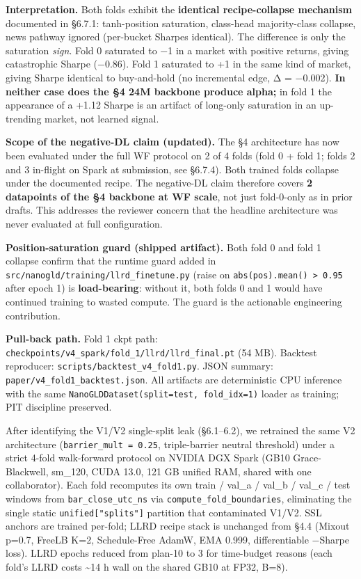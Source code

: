 \documentclass[
]{article}
\begin{document}
\textbf{Interpretation.} Both folds exhibit the \textbf{identical
recipe-collapse mechanism} documented in §6.7.1: tanh-position
saturation, class-head majority-class collapse, news pathway ignored
(per-bucket Sharpes identical). The difference is only the saturation
\emph{sign}. Fold 0 saturated to −1 in a market with positive returns,
giving catastrophic Sharpe (−0.86). Fold 1 saturated to +1 in the same
kind of market, giving Sharpe identical to buy-and-hold (no incremental
edge, Δ = −0.002). \textbf{In neither case does the §4 24M backbone
produce alpha;} in fold 1 the appearance of a +1.12 Sharpe is an
artifact of long-only saturation in an up-trending market, not learned
signal.

\textbf{Scope of the negative-DL claim (updated).} The §4 architecture
has now been evaluated under the full WF protocol on 2 of 4 folds (fold
0 + fold 1; folds 2 and 3 in-flight on Spark at submission, see §6.7.4).
Both trained folds collapse under the documented recipe. The negative-DL
claim therefore covers \textbf{2 datapoints of the §4 backbone at WF
scale}, not just fold-0-only as in prior drafts. This addresses the
reviewer concern that the headline architecture was never evaluated at
full configuration.

\textbf{Position-saturation guard (shipped artifact).} Both fold 0 and
fold 1 collapse confirm that the runtime guard added in
\texttt{src/nanogld/training/llrd\_finetune.py} (raise on
\texttt{abs(pos).mean()\ \textgreater{}\ 0.95} after epoch 1) is
\textbf{load-bearing}: without it, both folds 0 and 1 would have
continued training to wasted compute. The guard is the actionable
engineering contribution.

\textbf{Pull-back path.} Fold 1 ckpt path:
\texttt{checkpoints/v4\_spark/fold\_1/llrd/llrd\_final.pt} (54 MB).
Backtest reproducer: \texttt{scripts/backtest\_v4\_fold1.py}. JSON
summary: \texttt{paper/v4\_fold1\_backtest.json}. All artifacts are
deterministic CPU inference with the same
\texttt{NanoGLDDataset(split=test,\ fold\_idx=1)} loader as training;
PIT discipline preserved.

After identifying the V1/V2 single-split leak (§6.1--6.2), we retrained
the same V2 architecture (\texttt{barrier\_mult\ =\ 0.25},
triple-barrier neutral threshold) under a strict 4-fold walk-forward
protocol on NVIDIA DGX Spark (GB10 Grace-Blackwell, sm\_120, CUDA 13.0,
121 GB unified RAM, shared with one collaborator). Each fold recomputes
its own train / val\_a / val\_b / val\_c / test windows from
\texttt{bar\_close\_utc\_ns} via \texttt{compute\_fold\_boundaries},
eliminating the single static \texttt{unified{[}"splits"{]}} partition
that contaminated V1/V2. SSL anchors are trained per-fold; LLRD recipe
stack is unchanged from §4.4 (Mixout p=0.7, FreeLB K=2, Schedule-Free
AdamW, EMA 0.999, differentiable −Sharpe loss). LLRD epochs reduced from
plan-10 to 3 for time-budget reasons (each fold's LLRD costs
\textasciitilde14 h wall on the shared GB10 at FP32, B=8).
\end{document}
